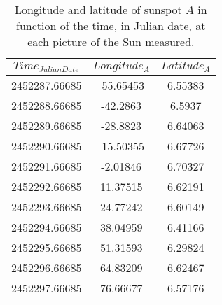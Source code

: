 \begin{table}[H]
	\centering
	\begin{tabular}{ c  c  c }
		\\\hline
		\centering
			$Time_{Julian Date}$ & $Longitude_{A}$ & $Latitude_{A}$ \\\hline
			2452287.66685 & -55.65453 & 6.55383 \\
			2452288.66685 & -42.2863 & 6.5937 \\
			2452289.66685 & -28.8823 & 6.64063 \\
			2452290.66685 & -15.50355 & 6.67726 \\
			2452291.66685 & -2.01846 & 6.70327 \\
			2452292.66685 & 11.37515 & 6.62191 \\
			2452293.66685 & 24.77242 & 6.60149 \\
			2452294.66685 & 38.04959 & 6.41166 \\
			2452295.66685 & 51.31593 & 6.29824 \\
			2452296.66685 & 64.83209 & 6.62467 \\
			2452297.66685 & 76.66677 & 6.57176 \\\hline
	\end{tabular}
	\caption{\label{Tab:sunspotA}Longitude and latitude of sunspot $A$ in function of the time, in Julian date, at each picture of the Sun measured.}
\end{table}
